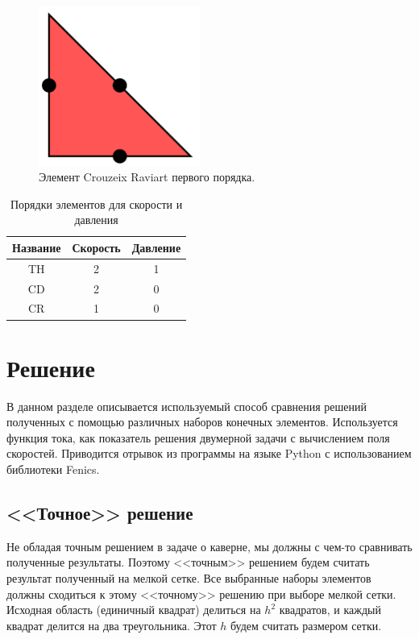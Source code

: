 \documentclass[12pt]{article}
\begin{document}
\begin{figure}
	\begin{center}
		\includegraphics[width=200px]{pics/crouzeix1}
		\caption{Элемент Crouzeix Raviart первого порядка.}
		\label{fg:crouzeix1}
	\end{center}
\end{figure}

\begin{table}
\begin{center}
\begin{tabular}{|c|c|c|}
\hline
Название & Скорость & Давление \\
\hline
TH & 2 & 1 \\
\hline
CD & 2 & 0 \\
\hline
CR & 1 & 0 \\
\hline
\end{tabular}
\end{center}
\caption{Порядки элементов для скорости и давления}
\label{tb:order}
\end{table}

\section{Решение}
В данном разделе описывается используемый способ сравнения решений полученных с помощью различных наборов конечных элементов. Используется функция тока, как показатель решения двумерной задачи с вычислением поля скоростей. Приводится отрывок из программы на языке Python с использованием библиотеки Fenics.

\subsection{<<Точное>> решение}
Не обладая точным решением в задаче о каверне, мы должны с чем-то сравнивать полученные результаты. Поэтому <<точным>> решением будем считать результат полученный на мелкой сетке. Все выбранные наборы элементов должны сходиться к этому <<точному>> решению при выборе мелкой сетки. Исходная область (единичный квадрат) делиться на $h^2$ квадратов, и каждый квадрат делится на два треугольника. Этот $h$ будем считать размером сетки.
\end{document}
